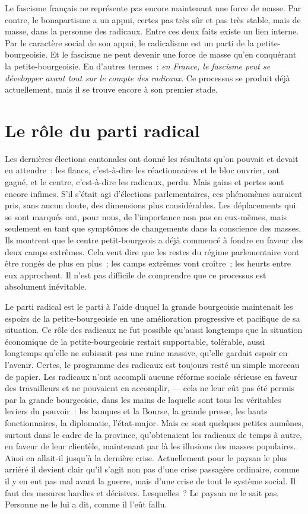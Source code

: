 \documentclass[french,twoside]{book} %
\begin{document}
Le fascisme français ne représente pas encore maintenant une force de masse. Par contre, le bonapartisme a un appui, certes pas très sûr et pas très stable, mais de masse, dans la personne des radicaux. Entre ces deux faits existe un lien interne. Par le caractère social de son appui, le radicalisme est un parti de la petite-bourgeoisie. Et le fascisme ne peut devenir une force de masse qu’en conquérant la petite-bourgeoisie. En d’autres termes : \emph{en France, le fascisme peut se développer avant tout sur le compte des radicaux}. Ce processus se produit déjà actuellement, mais il se trouve encore à son premier stade.
\section[{Le rôle du parti radical}]{Le rôle du parti radical}
\noindent Les dernières élections cantonales ont donné les résultats qu’on pouvait et devait en attendre : les flancs, c’est-à-dire les réactionnaires et le bloc ouvrier, ont gagné, et le centre, c’est-à-dire les radicaux, perdu. Mais gains et pertes sont encore infimes. S’il s’était agi d’élections parlementaires, ces phénomènes auraient pris, sans aucun doute, des dimensions plus considérables. Les déplacements qui se sont marqués ont, pour nous, de l’importance non pas en eux-mêmes, mais seulement en tant que symptômes de changements dans la conscience des masses. Ils montrent que le centre petit-bourgeois a déjà commencé à fondre en faveur des deux camps extrêmes. Cela veut dire que les restes du régime parlementaire vont être rongés de plus en plus ; les camps extrêmes vont croître ; les heurts entre eux approchent. Il n’est pas difficile de comprendre que ce processus est absolument inévitable.\par
 Le parti radical est le parti à l’aide duquel la grande bourgeoisie maintenait les espoirs de la petite-bourgeoisie en une amélioration progressive et pacifique de sa situation. Ce rôle des radicaux ne fut possible qu’aussi longtemps que la situation économique de la petite-bourgeoisie restait supportable, tolérable, aussi longtemps qu’elle ne subissait pas une ruine massive, qu’elle gardait espoir en l’avenir. Certes, le programme des radicaux est toujours resté un simple morceau de papier. Les radicaux n’ont accompli aucune réforme sociale sérieuse en faveur des travailleurs et ne pouvaient en accomplir, — cela ne leur eût pas été permis par la grande bourgeoisie, dans les mains de laquelle sont tous les véritables leviers du pouvoir : les banques et la Bourse, la grande presse, les hauts fonctionnaires, la diplomatie, l’état-major. Mais ce sont quelques petites aumônes, surtout dans le cadre de la province, qu’obtenaient les radicaux de temps à autre, en faveur de leur clientèle, maintenant par là les illusions des masses populaires. Ainsi en allait-il jusqu’à la dernière crise. Actuellement pour le paysan le plus arriéré il devient clair qu’il s’agit non pas d’une crise passagère ordinaire, comme il y en eut pas mal avant la guerre, mais d’une crise de tout le système social. Il faut des mesures hardies et décisives. Lesquelles ? Le paysan ne le sait pas. Personne ne le lui a dit, comme il l’eût fallu.\par
\end{document}
